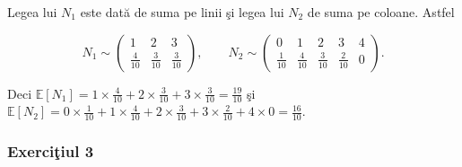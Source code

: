 \documentclass[]{article}
\def\EE{{\mathbb E}}
\begin{document}
\noindent
Legea lui \(N_1\) este dat\u a de suma pe linii \c si legea lui \(N_2\)
de suma pe coloane. Astfel

\begin{equation*}
N_1\sim\left(\begin{array}{ccc}
            1 & 2 & 3 \\
            \frac{4}{10} & \frac{3}{10} & \frac{3}{10}
        \end{array}
        \right), \quad\quad
N_2\sim\left(\begin{array}{ccccc}
            0 & 1 & 2 & 3 & 4\\
            \frac{1}{10} & \frac{4}{10} & \frac{3}{10} & \frac{2}{10} & 0
        \end{array}\right).
\end{equation*}

Deci
\(\EE[N_1] = 1\times\frac{4}{10} + 2\times\frac{3}{10} + 3\times\frac{3}{10} = \frac{19}{10}\)
\c si
\(\EE[N_2] = 0\times\frac{1}{10} + 1\times\frac{4}{10} + 2\times\frac{3}{10} + 3\times\frac{2}{10} + 4\times0= \frac{16}{10}\).

\subsubsection{\texorpdfstring{Exerci\c tiul
3}{Exerciiul 3}}\label{exerciiul-3}
\end{document}
